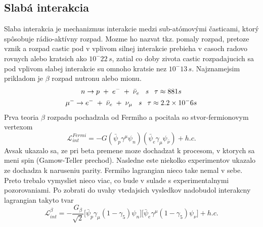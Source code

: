 \documentclass[../../main.tex]{subfiles}
\begin{document}
\subsection{Slabá interakcia}
Slaba interakcia je mechanizmus interakcie medzi sub-atómovými časticami, ktorý spôsobuje rádio-aktívny rozpad. Mozme ho nazvat tkz. pomaly rozpad, pretoze vznik a rozpad castic pod v vplivom silnej interakcie prebieha v casoch radovo rovnych alebo kratsich ako $10^-{22}\,s$, zatial co doby zivota castic rozpadajucich sa pod vplivom slabej interakcie su omnoho kratsie nez $10^-{13}\,s$. Najznamejsim prikladom je $\beta$ rozpad nutronu alebo mionu.
\begin{equation}
\begin{gathered}
n \rightarrow p\hspace{0.1cm}+\hspace{0.1cm}e^-\hspace{0.1cm}+\hspace{0.1cm} \bar{\nu}_e \hspace{0.3cm} \textit{s} \hspace{0.3cm} \tau \approx 881s \\ 
\mu^- \rightarrow e^- \hspace{0.1cm}+\hspace{0.1cm}\bar{\nu}_e\hspace{0.1cm}+\hspace{0.1cm} \nu_{\mu} \hspace{0.3cm} \textit{s} \hspace{0.3cm} \tau \approx 2.2\times10^-6s 
\end{gathered}
\end{equation}
Prva teoria $\beta$ rozpadu pochadzala od Fermiho a pocitala so stvor-fermionovym vertexom
\begin{equation}
\mathcal{L}_{int}^{Fermi}=-G(\bar{\psi}_p\gamma^{\mu}\psi_n)(\bar{\psi}_e\gamma_{\mu}\psi_{\bar{\nu}})+h.c.
\end{equation}
Avsak ukazalo sa, ze pri beta premene moze dochadzat k procesom, v ktorych sa meni spin (Gamow-Teller prechod). Nasledne este niekolko experimentov ukazalo ze dochadza k naruseniu parity. Fermiho lagrangian nieco take nemal v sebe. Preto trebalo vymysliet nieco viac, co bude v sulade s experimentalnymi pozorovaniami. Po zobrati do uvahy vtedajsich vysledkov nadobudol interakcny lagrangian takyto tvar
\begin{equation}
\mathcal{L}^{\beta}_{int}=-\frac{G_{\beta}}{\sqrt{2}}\big[ \bar{\psi}_p\gamma_{\mu}(1-\gamma_5)\psi_n \big] \big[ \bar{\psi}_e\gamma^{\mu}(1-\gamma_5)\psi_{\nu} \big]+h.c.
\end{equation}
\end{document}
